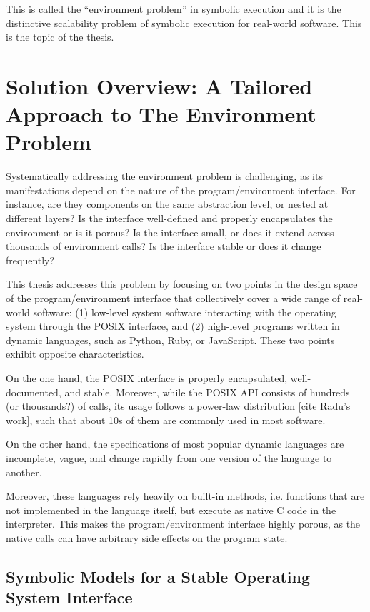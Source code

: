 This is called the ``environment problem'' in symbolic execution and it is the distinctive scalability problem of symbolic execution for real-world software.  This is the topic of the thesis.


\section{Solution Overview: A Tailored Approach to The Environment Problem}

Systematically addressing the environment problem is challenging, as its manifestations depend on the nature of the program/environment interface.  For instance, are they components on the same abstraction level, or nested at different layers?  Is the interface well-defined and properly encapsulates the environment or is it porous?  Is the interface small, or does it extend across thousands of environment calls?  Is the interface stable or does it change frequently?

This thesis addresses this problem by focusing on two points in the design space of the program/environment interface that collectively cover a wide range of real-world software: (1) low-level system software interacting with the operating system through the POSIX interface, and (2) high-level programs written in dynamic languages, such as Python, Ruby, or JavaScript.  These two points exhibit opposite characteristics.

On the one hand, the POSIX interface is properly encapsulated, well-documented, and stable.  Moreover, while the POSIX API consists of hundreds (or thousands?) of calls, its usage follows a power-law distribution [cite Radu's work], such that about 10s of them are commonly used in most software.

On the other hand, the specifications of most popular dynamic languages are incomplete, vague, and change rapidly from one version of the language to another.

Moreover, these languages rely heavily on built-in methods, i.e. functions that are not implemented in the language itself, but execute as native C code in the interpreter.  This makes the program/environment interface highly porous, as the native calls can have arbitrary side effects on the program state.

\subsection{Symbolic Models for a Stable Operating System Interface}

